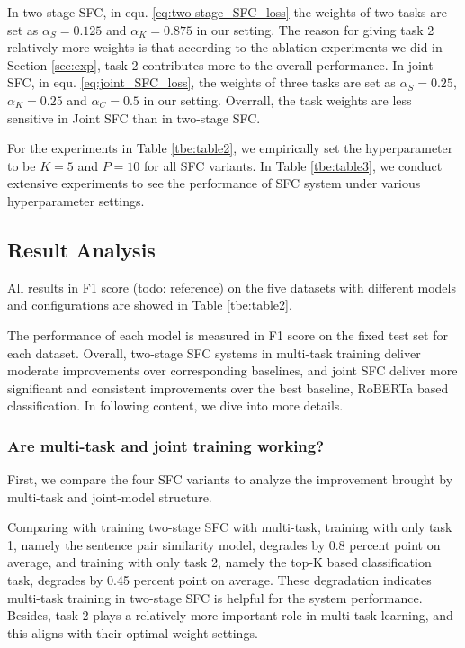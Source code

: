 \documentclass[letterpaper]{article} %
\begin{document}
  In two-stage SFC, in equ. \ref{eq:two-stage_SFC_loss} the weights of two tasks
  are  set  as  $\alpha_S=0.125$ and $\alpha_K=0.875$ in our setting. The reason
  for  giving  task  2 relatively more weights is that according to the ablation
  experiments  we  did  in Section \ref{sec:exp}, task 2 contributes more to the
  overall  performance.  In  joint  SFC,  in  equ.  \ref{eq:joint_SFC_loss}, the
  weights  of  three  tasks  are  set  as  $\alpha_S=0.25$,  $\alpha_K=0.25$ and
  $\alpha_C=0.5$  in  our setting. Overrall, the task weights are less sensitive
  in Joint SFC than in two-stage SFC.

  For  the  experiments  in  Table  \ref{tbe:table2},  we  empirically  set  the
  hyperparameter  to  be  $K=5$  and  $P=10$  for  all  SFC  variants.  In Table
  \ref{tbe:table3},  we  conduct extensive experiments to see the performance of
  SFC system under various hyperparameter settings.

  \subsection{Result Analysis}
  All results in F1 score (todo: reference) on the five datasets with different models and configurations are
  showed in Table  \ref{tbe:table2}.

  The performance of each model is measured in F1 score on the fixed
  test  set  for  each  dataset.  
  Overall,  two-stage  SFC systems in multi-task training deliver  moderate 
  improvements  over  corresponding baselines, and joint SFC deliver more
  significant and consistent improvements over the best baseline, RoBERTa based
  classification. In following content, we dive into more details.

  \subsubsection*{Are multi-task and joint training working?} 
  First, we compare the four  SFC  variants to analyze the improvement
  brought  by  multi-task  and  joint-model  structure. 

  Comparing with training two-stage SFC with multi-task, training with only task
  1,  namely the sentence pair similarity model, degrades by 0.8 percent
  point  on average, and training with only task 2, namely the top-K based
  classification  task,  degrades  by  0.45  percent  point  on  average.  These
  degradation  indicates  multi-task training in two-stage SFC is helpful for the
  system  performance.  Besides, task 2 plays a relatively more important role in
  multi-task learning, and this aligns with their optimal weight settings.
\end{document}
